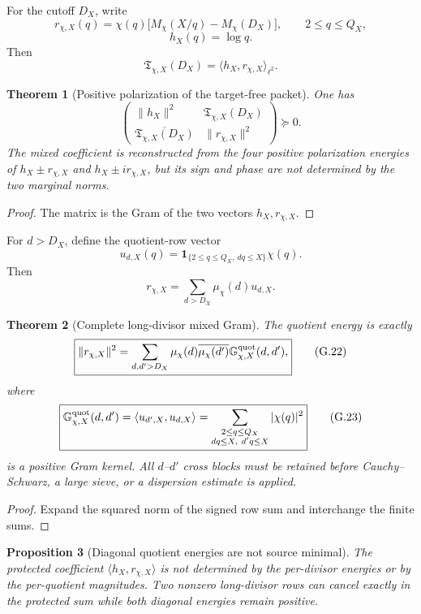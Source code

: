 \documentclass[11pt]{article}
\newtheorem{theorem}{Theorem}[section]
\newtheorem{proposition}[theorem]{Proposition}
\theoremstyle{definition}
\theoremstyle{remark}
\newcommand{\one}{\mathbf 1}
\begin{document}
For the cutoff \(D_X\), write
\[
 r_{\chi,X}(q)
 =\chi(q)\bigl[M_\chi(X/q)-M_\chi(D_X)\bigr],
 \qquad 2\le q\le Q_X,
\]
\[
 h_X(q)=\log q.
\]
Then
\[
 \boxed{
 \mathfrak T_{\chi,X}(D_X)
 =\langle h_X,r_{\chi,X}\rangle_{\ell^2}.}
 \tag{G.20}
\]

\begin{theorem}[Positive polarization of the target-free packet]
\label{thm:grhouter-positive-polarization}
One has
\[
 \boxed{
 \begin{pmatrix}
  \|h_X\|^2&\mathfrak T_{\chi,X}(D_X)\\
  \overline{\mathfrak T_{\chi,X}(D_X)}&\|r_{\chi,X}\|^2
 \end{pmatrix}
 \succeq0.}
 \tag{G.21}
\]
The mixed coefficient is reconstructed from the four positive polarization
energies of \(h_X\pm r_{\chi,X}\) and
\(h_X\pm i r_{\chi,X}\), but its sign and phase are not determined by the
two marginal norms.
\end{theorem}

\begin{proof}
The matrix is the Gram of the two vectors \(h_X,r_{\chi,X}\).
\end{proof}

For \(d>D_X\), define the quotient-row vector
\[
 u_{d,X}(q)
 =\one_{\{2\le q\le Q_X,\ dq\le X\}}\chi(q).
\]
Then
\[
 r_{\chi,X}
 =\sum_{d>D_X}\mu_\chi(d)u_{d,X}.
\]

\begin{theorem}[Complete long-divisor mixed Gram]
\label{thm:grhouter-complete-Gram}
The quotient energy is exactly
\[
 \boxed{
 \|r_{\chi,X}\|^2
 =\sum_{d,d'>D_X}
   \mu_\chi(d)\overline{\mu_\chi(d')}
   \mathbb G_{\chi,X}^{\rm quot}(d,d'),}
 \tag{G.22}
\]
where
\[
 \boxed{
 \mathbb G_{\chi,X}^{\rm quot}(d,d')
 =\langle u_{d',X},u_{d,X}\rangle
 =\sum_{\substack{2\le q\le Q_X\\dq\le X,\ d'q\le X}}
   |\chi(q)|^2}
 \tag{G.23}
\]
is a positive Gram kernel.  All \(d\)--\(d'\) cross blocks must be retained
before Cauchy--Schwarz, a large sieve, or a dispersion estimate is applied.
\end{theorem}

\begin{proof}
Expand the squared norm of the signed row sum and interchange the finite sums.
\end{proof}

\begin{proposition}[Diagonal quotient energies are not source minimal]
\label{cth:grhouter-diagonal-no-go}
The protected coefficient \(\langle h_X,r_{\chi,X}\rangle\) is not determined
by the per-divisor energies or by the per-quotient magnitudes.  Two nonzero
long-divisor rows can cancel exactly in the protected sum while both diagonal
energies remain positive.
\end{proposition}
\end{document}
